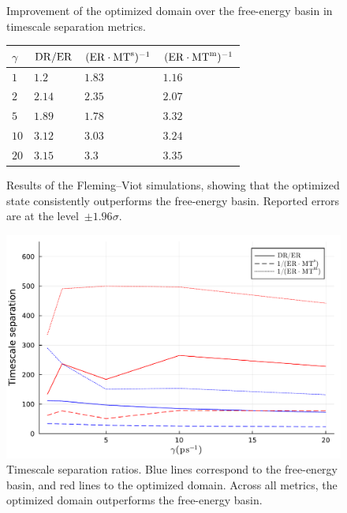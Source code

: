 \begin{figure}[ht]
    \begin{subtable}{0.9\textwidth}
    \centering
    \caption[]{Improvement of the optimized domain over the free-energy basin in timescale separation metrics.}
    \begin{tabular}{l|lll}
      \hline
      $\gamma$ & $\mathrm{DR}/\mathrm{ER}$ & $(\mathrm{ER}\cdot\mathrm{MT}^{\mathrm{s}})^{-1}$ & $(\mathrm{ER}\cdot\mathrm{MT}^{\mathrm{m}})^{-1}$ \\
      \hline 
$1$ & $1.2$ &  $1.83$ &  $1.16$\\
$2$ &  $2.14$ &   $2.35$ &  $2.07$\\
$5$ &  $1.89$ &$1.78$ &$3.32$\\
$10$ & $3.12$ & $3.03$ & $3.24$\\
$20$ &  $3.15$ &  $3.3$ & $3.35$\\
    \hline
\end{tabular}
\label{03:tab:ratios}
\end{subtable}
  \caption[]{Results of the Fleming--Viot simulations, showing that the optimized state consistently outperforms the free-energy basin. Reported errors are at the level~$\pm1.96\sigma$.}
  \label{03:fig:benchmark_opt}
  \normalsize
\end{figure}

\begin{figure}
\centering
\includegraphics[width=0.75\linewidth]{figures/03/shape_optim_diala/benchmark.pdf}
\caption[]{Timescale separation ratios. Blue lines correspond to the free-energy basin, and red lines to the optimized domain. Across  all metrics, the optimized domain outperforms the free-energy basin.}
\label{03:fig:benchmark_visual}
\end{figure}

